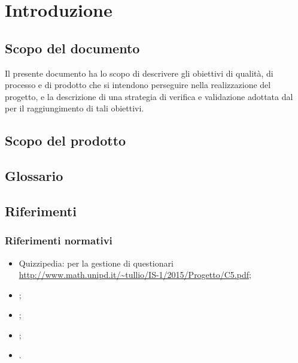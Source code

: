 \documentclass[a4paper, titlepage]{article}
\begin{document}
\newpage
\tableofcontents
\newpage
\listoftables
\label{lastromanpage}

\newpage
\clearpage	
{}

\hypersetup{linkcolor=blue}
\section{Introduzione}
\subsection{Scopo del documento}
Il presente documento ha lo scopo di descrivere gli obiettivi di qualità, di processo e di prodotto che si intendono perseguire nella realizzazione del progetto, e la descrizione di una strategia di verifica e validazione adottata dal  per il raggiungimento di tali obiettivi.

\subsection{Scopo del prodotto}
\SCOPO

\subsection{Glossario}
\GLOSSARIO

\subsection{Riferimenti}
\subsubsection{Riferimenti normativi}
\begin{itemize}
\item {} Quizzipedia:  per la gestione di questionari
\newline \url{http://www.math.unipd.it/~tullio/IS-1/2015/Progetto/C5.pdf};
\item {} \NdPdoc;
\item {} \ARdoc;
\item {} \PdPdoc;
\item {} \STdoc.
\end{itemize}
\end{document}
